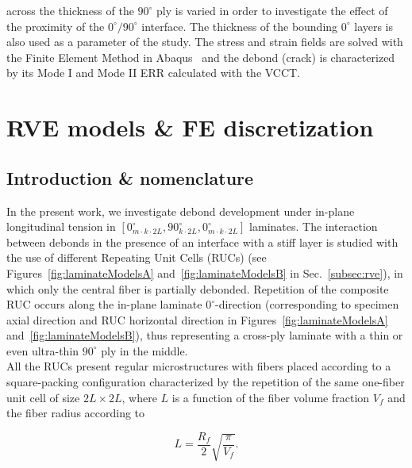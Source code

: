 \documentclass[review]{elsarticle}
\begin{document}
across the thickness of the $90^{\circ}$ ply is varied in order to investigate the effect of the proximity of the $0^{\circ}/90^{\circ}$ interface. The thickness of the bounding $0^{\circ}$ layers is also used as a parameter of the study. The stress and strain fields are solved with the Finite Element Method in Abaqus~\cite{abq12} and the debond (crack) is characterized by its Mode I and Mode II ERR calculated with the VCCT.


\section{RVE models \& FE discretization}


\subsection{Introduction \& nomenclature}\label{subsec:names}

In the present work, we investigate debond development under in-plane longitudinal tension in $\left[0_{m\cdot k\cdot2L}^{\circ},90_{k\cdot2L}^{\circ},0_{m\cdot k\cdot2L}^{\circ}\right]$ laminates. The interaction between debonds in the presence of an interface with a stiff layer is studied with the use of different Repeating Unit Cells (RUCs)  (see Figures~\ref{fig:laminateModelsA} and~\ref{fig:laminateModelsB} in Sec.~\ref{subsec:rve}), in which only the central fiber is partially debonded. Repetition of the composite RUC occurs along the in-plane laminate $0^{\circ}$-direction (corresponding to specimen axial direction and RUC horizontal direction in Figures~\ref{fig:laminateModelsA} and~\ref{fig:laminateModelsB}), thus representing a cross-ply laminate with a thin or even ultra-thin $90^{\circ}$ ply in the middle.\\
All the RUCs present regular microstructures with fibers placed according to a square-packing configuration characterized by the repetition of the same one-fiber unit cell of size $2L\times2L$, where $L$ is a function of the fiber volume fraction $V_{f}$ and the fiber radius according to

\begin{equation}\label{eq:LVf}
L=\frac{R_{f}}{2}\sqrt{\frac{\pi}{V_{f}}}.
\end{equation}
\end{document}
